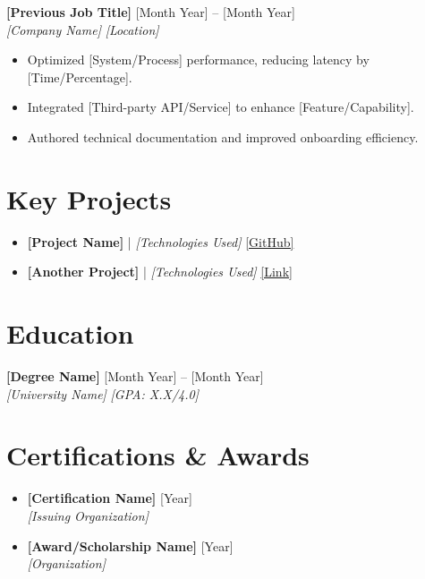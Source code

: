 \documentclass[11pt,a4paper]{article} %
\newcommand{\resumeEntry}[4]{%
  {\textbf{\color{primary}#1}} \hfill #2\\
  {\textit{\color{accent}#3}} \hfill {\textit{\color{accent}#4}}
}
\begin{document}
\resumeEntry{[Previous Job Title]}{[Month Year] -- [Month Year]}{[Company Name]}{[Location]}
\begin{itemize}
    \item Optimized [System/Process] performance, reducing latency by [Time/Percentage].
    \item Integrated [Third-party API/Service] to enhance [Feature/Capability].
    \item Authored technical documentation and improved onboarding efficiency.
\end{itemize}

\section*{Key Projects}
\begin{itemize}
    \item \textbf{[Project Name]} | \textit{[Technologies Used]}  \href{https://github.com/user/repo}{[GitHub]}
    
    \item \textbf{[Another Project]} | \textit{[Technologies Used]}  \href{https://github.com/user/repo}{[Link]}
\end{itemize}

\section*{Education}
\resumeEntry{[Degree Name]}{[Month Year] -- [Month Year]}{[University Name]}{[GPA: X.X/4.0]}

\section*{Certifications \& Awards}
\begin{itemize}
    \item \textbf{[Certification Name]} \hfill [Year] \\
    \textit{[Issuing Organization]}
    
    \item \textbf{[Award/Scholarship Name]} \hfill [Year] \\
    \textit{[Organization]}
\end{itemize}

\end{document}
